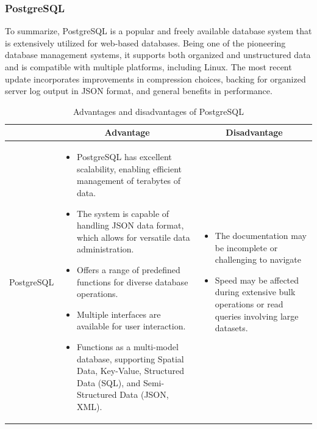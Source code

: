 \subsubsection{PostgreSQL}

To summarize, PostgreSQL is a popular and freely available database system that is extensively utilized for web-based databases. Being one of the pioneering database management systems, it supports both organized and unstructured data and is compatible with multiple platforms, including Linux. The most recent update incorporates improvements in compression choices, backing for organized server log output in JSON format, and general benefits in performance.

\begin{table}[H]
    \centering
    \begin{tabular}{| c | p{} | p{} |}
        \hline
        \multicolumn{1}{|c|}{}
        & \multicolumn{1}{c|}{Advantage}
        & \multicolumn{1}{c|}{Disadvantage} \\ \hline
        \multirow{10}{*}{PostgreSQL}     
                &   \begin{itemize}[leftmargin=*,topsep=0pt,partopsep=0pt,parsep=0pt]
                        \item PostgreSQL has excellent scalability, enabling efficient management of terabytes of data.
                        \item The system is capable of handling JSON data format, which allows for versatile data administration.
                        \item Offers a range of predefined functions for diverse database operations.
                        \item Multiple interfaces are available for user interaction.
                        \item Functions as a multi-model database, supporting Spatial Data, Key-Value, Structured Data (SQL), and Semi-Structured Data (JSON, XML).
                    \end{itemize}
                &   \begin{itemize}[leftmargin=*,topsep=0pt,partopsep=0pt,parsep=0pt]
                        \item The documentation may be incomplete or challenging to navigate
                        \item Speed may be affected during extensive bulk operations or read queries involving large datasets.
                    \end{itemize} \\ \hline
    \end{tabular}
    \caption{Advantages and disadvantages of PostgreSQL}
\end{table}

